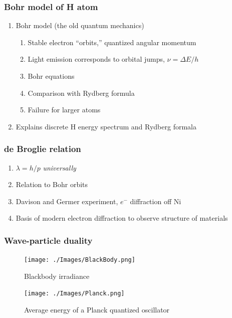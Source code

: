 \documentclass[11pt]{article}
\begin{document}
\subsubsection{Bohr model of H atom}
\label{sec:org00446bf}
\begin{enumerate}
\item Bohr model (the old quantum mechanics)
\begin{enumerate}
\item Stable electron ``orbits,'' quantized angular momentum
\item Light emission corresponds to orbital jumps, \(\nu=\Delta E/h\)
\item Bohr equations
\item Comparison with Rydberg formula
\item Failure for larger atoms
\end{enumerate}
\item Explains discrete H energy spectrum and Rydberg formala
\end{enumerate}
\subsubsection{de Broglie relation}
\label{sec:org5acb7fb}
\begin{enumerate}
\item \(\lambda=h/p\) \emph{universally}
\item Relation to Bohr orbits
\item Davison and Germer experiment, \(e^-\) diffraction off Ni
\item Basis of modern electron diffraction to observe structure of materials
\end{enumerate}
\subsubsection{Wave-particle duality}
\label{sec:org6fa79bf}

\begin{figure}[htbp]
\centering
\texttt{[image: ./Images/BlackBody.png]}
\caption{Blackbody irradiance}
\end{figure}
\begin{figure}[htbp]
\centering
\texttt{[image: ./Images/Planck.png]}
\caption{Average energy of a Planck quantized oscillator}
\end{figure}
\end{document}
